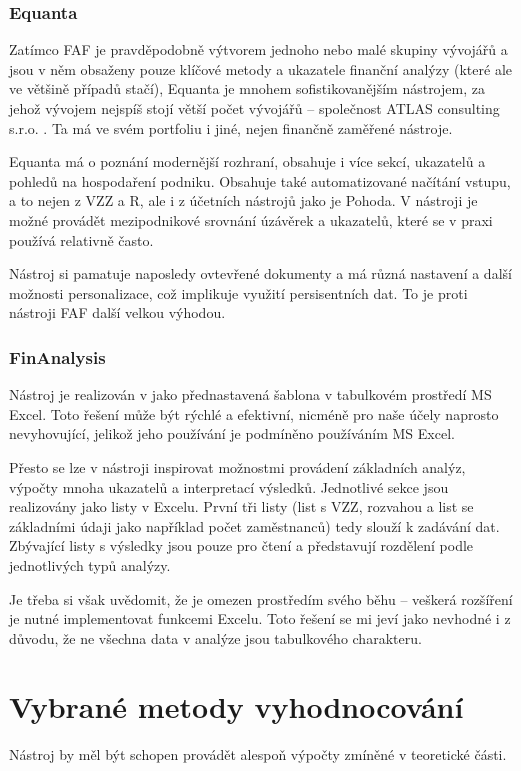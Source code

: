 \subsubsection{Equanta}
Zatímco FAF je pravděpodobně výtvorem jednoho nebo malé skupiny vývojářů a jsou v něm obsaženy pouze klíčové metody a ukazatele finanční analýzy (které ale ve většině případů stačí), Equanta je mnohem sofistikovanějším nástrojem, za jehož vývojem nejspíš stojí větší počet vývojářů -- společnost ATLAS consulting s.r.o. . Ta má ve svém portfoliu i jiné, nejen finančně zaměřené nástroje.

Equanta má o poznání modernější rozhraní, obsahuje i více sekcí, ukazatelů a pohledů na hospodaření podniku. Obsahuje také automatizované načítání vstupu, a to nejen z VZZ a R, ale i z účetních nástrojů jako je Pohoda. V nástroji je možné provádět mezipodnikové srovnání úzávěrek a ukazatelů, které se v praxi používá relativně často.

Nástroj si pamatuje naposledy ovtevřené dokumenty a má různá nastavení a další možnosti personalizace, což implikuje využití persisentních dat. To je proti nástroji FAF další velkou výhodou. 


\subsubsection{FinAnalysis}
Nástroj je realizován v jako přednastavená šablona v tabulkovém prostředí MS Excel. Toto řešení může být rýchlé a efektivní, nicméně pro naše účely naprosto nevyhovující, jelikož jeho používání je podmíněno používáním MS Excel.

Přesto se lze v nástroji inspirovat možnostmi provádení základních analýz, výpočty mnoha ukazatelů a interpretací výsledků. Jednotlivé sekce jsou realizovány jako listy v Excelu. První tři listy (list s VZZ, rozvahou a list se základními údaji jako například počet zaměstnanců) tedy slouží k zadávání dat. Zbývající listy s výsledky jsou pouze pro čtení a představují rozdělení podle jednotlivých typů analýzy.  

Je třeba si však uvědomit, že je omezen prostředím svého běhu -- veškerá rozšíření je nutné implementovat funkcemi Excelu. Toto řešení se mi jeví jako nevhodné i z důvodu, že ne všechna data v analýze jsou tabulkového charakteru.



\section{Vybrané metody vyhodnocování}
Nástroj by měl být schopen provádět alespoň výpočty zmíněné v teoretické části.

